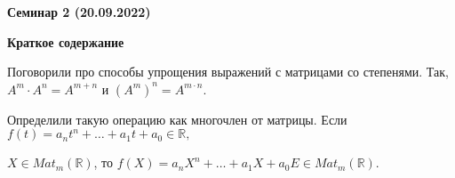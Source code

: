 \documentclass[10pt, a4paper]{extarticle}
\def \R{\mathbb{R}}
\theoremstyle{definition}
\begin{document}
\begin{center}
\small
\noindent{}
\end{center}

\large

\begin{center}
\textbf{Семинар 2 (20.09.2022)}
\end{center}

\textbf{Краткое содержание}

Поговорили про способы упрощения выражений с матрицами со степенями. Так, $A^m \cdot A^n = A^{m+n}$
и  $\left(A^m\right)^n = A^{m\cdot n}$.

Определили такую операцию как многочлен от матрицы. Если $f(t) = a_n t^n + \dots + a_1t + a_0 \in \R,$ 

$X \in Mat_{m}(\R)$, то 
$f(X) = a_n X^n + \dots + a_1X + a_0E \in Mat_m(\R)$.
\end{document}
